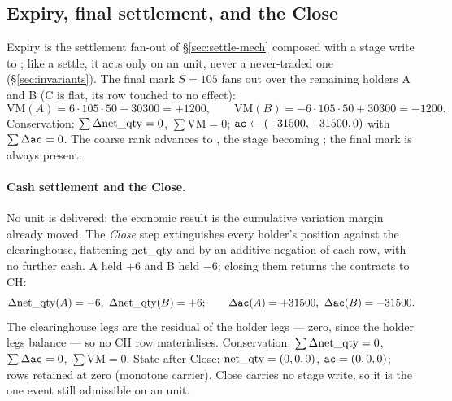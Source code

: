 \subsection{Expiry, final settlement, and the Close}

Expiry is the settlement fan-out of \S\ref{sec:settle-mech} composed with a stage write to
; like a settle, it acts only on an  unit, never a never-traded one
(\S\ref{sec:invariants}). The final mark $S=105$ fans out over the remaining holders A and B (C is
flat, its row touched to no effect):
\[
\mathrm{VM}(A) = 6\cdot 105\cdot 50 - 30300 = +1200,\qquad
\mathrm{VM}(B) = -6\cdot 105\cdot 50 + 30300 = -1200.
\]
Conservation: $\sum\Delta\mathrm{net\_qty}=0$, $\sum\mathrm{VM}=0$; $\texttt{ac}\leftarrow(-31500,+31500,0)$ with
$\sum\Delta\texttt{ac}=0$. The coarse rank advances to , the stage becoming
; the final mark is always present.

\paragraph{Cash settlement and the Close.} No unit is delivered; the economic result is the
cumulative variation margin already moved. The \emph{Close} step extinguishes every holder's position
against the clearinghouse, flattening $\mathrm{net\_qty}$ and \ac{} by an additive negation of each row, with no
further cash. A held $+6$ and B held $-6$; closing them returns the contracts to CH:
\[
\Delta\mathrm{net\_qty}(A)=-6,\ \Delta\mathrm{net\_qty}(B)=+6;\qquad \Delta\texttt{ac}(A)=+31500,\ \Delta\texttt{ac}(B)=-31500.
\]
The clearinghouse legs are the residual of the holder legs --- zero, since the holder legs balance ---
so no CH row materialises. Conservation: $\sum\Delta\mathrm{net\_qty}=0$, $\sum\Delta\texttt{ac}=0$, $\sum\mathrm{VM}=0$.
State after Close: $\mathrm{net\_qty}=(0,0,0)$, $\texttt{ac}=(0,0,0)$; rows retained at zero (monotone carrier). Close
carries no stage write, so it is the one event still admissible on an  unit.

